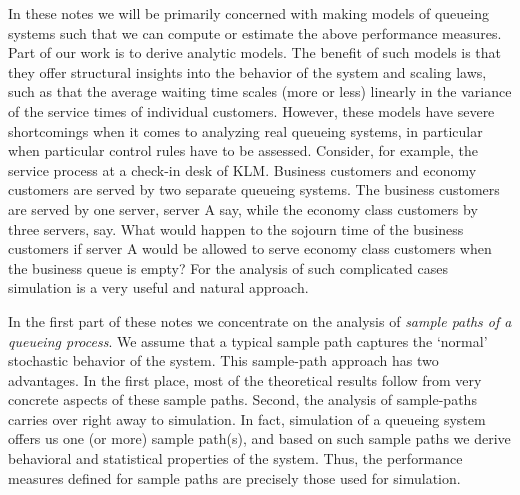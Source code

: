 In these notes we will be primarily concerned with making models of
queueing systems such that we can compute or estimate the above
performance measures.  Part of our work is to derive analytic
models. The benefit of such models is that they offer structural
insights into the behavior of the system and scaling laws, such as
that the average waiting time scales (more or less) linearly in the
variance of the service times of individual customers. However, these
models have severe shortcomings when it comes to analyzing real
queueing systems, in particular when particular control rules have to
be assessed.  Consider, for example, the service process at a check-in
desk of KLM. Business customers and economy customers are served by
two separate queueing systems. The business customers are served by
one server, server A say, while the economy class customers by three
servers, say. What would happen to the sojourn time of the business
customers if server A would be allowed to serve economy class
customers when the business queue is empty? For the analysis of such complicated
cases simulation is a very useful and natural approach.

In the first part of these notes we concentrate on the analysis of
\emph{sample paths of a queueing process}. We assume that a typical
sample path captures the `normal' stochastic behavior of the
system. This sample-path approach has two advantages. In the first
place, most of the theoretical results follow from very concrete
aspects of these sample paths. Second, the analysis of sample-paths
carries over right away to simulation. In fact, simulation of a
queueing system offers us one (or more) sample path(s), and based on
such sample paths we derive behavioral and statistical properties of
the system. Thus, the performance measures defined for sample paths
are precisely those used for simulation.  

